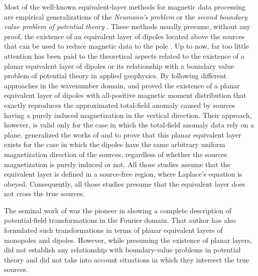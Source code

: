 \documentclass[manuscript,noblind]{geophysics}
\begin{document}
	Most of the well-known equivalent-layer methods for magnetic data processing are 
	empirical generalizations of the \textit{Neumann's problem} or the \textit{second boundary value problem of potential 
		theory} \cite[][ p. 246]{kellogg1967}.
	These methods usually presume, without any proof, the existence of an equivalent layer of dipoles located above 
	the sources that can be used to reduce magnetic data to the pole 
	\citep[e.g.,][]{emilia1973, bhattacharyya_chan1977, silva1986, leao-silva_1989, oliveirajr_etal2013, 
		li_etal2014, oliveirajr_etal2015, ribeiro_filho_etal2020, reis_etal2020, li-etal2021, takahashi-etal2022, piauilino_etal2025}. 
	Up to now, far too little attention has been paid to the theoretical aspects related to the existence of
	a planar equivalent layer of dipoles or its relationship with a boundary value
	problem of potential theory in applied geophysics.
	By following different approaches in the wavenumber domain, 
	\citet{pedersen1991} and \citet{li_etal2014} proved the existence of a
	planar equivalent layer of dipoles with all-positive
	magnetic moment distribution that exactly reproduces the approximated total-field anomaly
	\cite[e.g., ][ p. 179]{blakely1996} caused by sources having a purely induced magnetization
	in the vertical direction.
	Their approach, however, is valid only for the case in which 
	the total-field anomaly data rely on a plane.
	\citet{reis_etal2020} generalized the works of \citet{pedersen1991} and \citet{li_etal2014}
	to prove that this planar equivalent layer exists for the case in which the dipoles have 
	the same arbitrary uniform magnetization direction of the sources, regardless of whether 
	the sources magnetization is purely induced or not.
	All those studies assume that the equivalent layer is defined in a source-free region, where  
	Laplace’s equation is obeyed. Consequently, all those studies presume that the equivalent layer 
	does not cross the true sources.
	
	The seminal work of \citet{gunn1975} was the pioneer in showing a complete description of potential-field 
	transformations in the Fourier domain. That author has also formulated such transformations in terms of 
	planar equivalent layers of monopoles and dipoles.
	However, while presuming the existence of planar layers, \citet{gunn1975} did not establish any relationship 
	with boundary-value problems in potential theory and did not take into account situations in which they 
	intersect the true sources.
	
\end{document}
